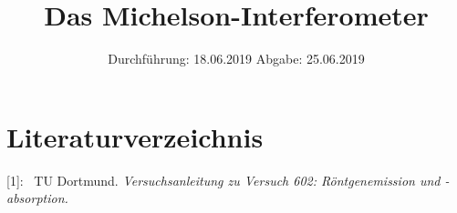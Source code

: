 

\subject{Nr. 401}
\title{Das Michelson-Interferometer}
\date{%
  Durchführung: 18.06.2019
  \hspace{3em}
  Abgabe: 25.06.2019
}



\maketitle
\thispagestyle{empty}
\tableofcontents
\newpage






\section{Literaturverzeichnis}

[1]: \ TU Dortmund. \textit{Versuchsanleitung zu Versuch 602:
Röntgenemission und -absorption.}\newline


\printbibliography{}



